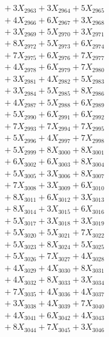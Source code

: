 \documentclass[a4paper,10pt]{article}
\begin{document}
{\begin{align}
&\;  + 3 X_{2963} + 3 X_{2964} + 5 X_{2965} \\[0.3ex]
&\;  + 4 X_{2966} + 6 X_{2967} + 3 X_{2968} \\[0.3ex]
&\;  + 3 X_{2969} + 5 X_{2970} + 3 X_{2971} \\[0.3ex]
&\;  + 8 X_{2972} + 5 X_{2973} + 6 X_{2974} \\[0.3ex]
&\;  + 7 X_{2975} + 6 X_{2976} + 7 X_{2977} \\[0.3ex]
&\;  + 4 X_{2978} + 6 X_{2979} + 7 X_{2980} \\[0.5ex]\allowbreak
&\;  + 3 X_{2981} + 4 X_{2982} + 5 X_{2983} \\[0.3ex]
&\;  + 3 X_{2984} + 5 X_{2985} + 8 X_{2986} \\[0.3ex]
&\;  + 4 X_{2987} + 5 X_{2988} + 6 X_{2989} \\[0.3ex]
&\;  + 5 X_{2990} + 6 X_{2991} + 6 X_{2992} \\[0.3ex]
&\;  + 7 X_{2993} + 7 X_{2994} + 7 X_{2995} \\[0.3ex]
&\;  + 5 X_{2996} + 4 X_{2997} + 7 X_{2998} \\[0.3ex]
&\;  + 5 X_{2999} + 8 X_{3000} + 8 X_{3001} \\[0.3ex]
&\;  + 6 X_{3002} + 6 X_{3003} + 8 X_{3004} \\[0.3ex]
&\;  + 5 X_{3005} + 3 X_{3006} + 8 X_{3007} \\[0.3ex]
&\;  + 7 X_{3008} + 3 X_{3009} + 6 X_{3010} \\[0.5ex]\allowbreak
&\;  + 8 X_{3011} + 6 X_{3012} + 3 X_{3013} \\[0.3ex]
&\;  + 8 X_{3014} + 3 X_{3015} + 6 X_{3016} \\[0.3ex]
&\;  + 5 X_{3017} + 3 X_{3018} + 3 X_{3019} \\[0.3ex]
&\;  + 5 X_{3020} + 5 X_{3021} + 7 X_{3022} \\[0.3ex]
&\;  + 5 X_{3023} + 8 X_{3024} + 5 X_{3025} \\[0.3ex]
&\;  + 5 X_{3026} + 7 X_{3027} + 4 X_{3028} \\[0.3ex]
&\;  + 4 X_{3029} + 4 X_{3030} + 8 X_{3031} \\[0.3ex]
&\;  + 4 X_{3032} + 8 X_{3033} + 3 X_{3034} \\[0.3ex]
&\;  + 7 X_{3035} + 4 X_{3036} + 4 X_{3037} \\[0.3ex]
&\;  + 3 X_{3038} + 4 X_{3039} + 7 X_{3040} \\[0.5ex]\allowbreak
&\;  + 4 X_{3041} + 6 X_{3042} + 4 X_{3043} \\[0.3ex]
&\;  + 8 X_{3044} + 7 X_{3045} + 3 X_{3046} \\[0.3ex]

\end{align}}
\end{document}
